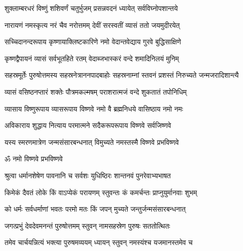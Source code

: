 
\twolineshloka
{शुक्लाम्बरधरं विष्णुं शशिवर्णं चतुर्भुजम्}
{प्रसन्नवदनं ध्यायेत् सर्वविघ्नोपशान्तये}

\twolineshloka
{नारायणं नमस्कृत्य नरं चैव नरोत्तमम्}
{देवीं सरस्वतीं व्यासं ततो जयमुदीरयेत्}

\twolineshloka
{सच्चिदानन्दरूपाय कृष्णायाक्लिष्टकारिणे}
{नमो वेदान्तवेद्याय गुरवे बुद्धिसाक्षिणे}

\twolineshloka
{कृष्णद्वैपायनं व्यासं सर्वभूतहिते रतम्}
{वेदाब्जभास्करं वन्दे शमादिनिलयं मुनिम्}

\fourlineindentedshloka
{सहस्रमूर्तेः पुरुषोत्तमस्य}
{सहस्रनेत्राननपादबाहोः}
{सहस्रनाम्नां स्तवनं प्रशस्तं}
{निरुच्यते जन्मजरादिशान्त्यै}

\twolineshloka
{व्यासं वसिष्ठनप्तारं शक्तेः पौत्रमकल्मषम्}
{पराशरात्मजं वन्दे शुकतातं तपोनिधिम्}

\twolineshloka
{व्यासाय विष्णुरूपाय व्यासरूपाय विष्णवे}
{नमो वै ब्रह्मनिधये वासिष्ठाय नमो नमः}

\twolineshloka
{अविकाराय शुद्धाय नित्याय परमात्मने}
{सदैकरूपरूपाय विष्णवे सर्वजिष्णवे}

\twolineshloka
{यस्य स्मरणमात्रेण जन्मसंसारबन्धनात्}
{विमुच्यते नमस्तस्मै विष्णवे प्रभविष्णवे}

\centerline{ॐ नमो विष्णवे प्रभविष्णवे}

\resetShloka
\twolineshloka
{श्रुत्वा धर्मानशेषेण पावनानि च सर्वशः}
{युधिष्ठिरः शान्तनवं पुनरेवाभ्यभाषत}

\twolineshloka
{किमेकं दैवतं लोके किं वाऽप्येकं परायणम्}
{स्तुवन्तः कं कमर्चन्तः प्राप्नुयुर्मानवाः शुभम्}

\twolineshloka
{को धर्मः सर्वधर्माणां भवतः परमो मतः}
{किं जपन् मुच्यते जन्तुर्जन्मसंसारबन्धनात्}

\twolineshloka
{जगत्प्रभुं देवदेवमनन्तं पुरुषोत्तमम्}
{स्तुवन् नामसहस्रेण पुरुषः सततोत्थितः}

\twolineshloka
{तमेव चार्चयन्नित्यं भक्त्या पुरुषमव्ययम्}
{ध्यायन् स्तुवन् नमस्यंश्च यजमानस्तमेव च}

